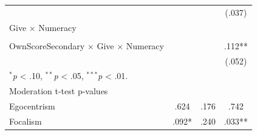 \begin{tabular*}{.84\linewidth}{@{\extracolsep{\fill}}lccc}
    &  &  & \mbox{(.037)\hphantom{88}}\\
   Give $\times$ Numeracy &  &  & \\
    &  &  & \\
   OwnScoreSecondary $\times$ Give $\times$ Numeracy &  &  & \mbox{\hphantom{8}.112**\hphantom{8}}\\
    &  &  & \mbox{(.052)\hphantom{88}}\\
   \multicolumn{4}{l}{\scriptsize $^{*}$\textit{p} < .10, $^{**}$\textit{p} < .05, $^{***}$\textit{p} < .01.}\\
   \midrule
   Moderation t-test p-values &  &  & \\
   \hspace{1em}Egocentrism & \mbox{\hphantom{8}.624\hphantom{888}} & \mbox{\hphantom{8}.176\hphantom{888}} & \mbox{\hphantom{8}.742\hphantom{888}}\\
   \hspace{1em}Focalism & \mbox{\hphantom{8}.092*\hphantom{88}} & \mbox{\hphantom{8}.240\hphantom{888}} & \mbox{\hphantom{8}.033**\hphantom{8}}\\
   \bottomrule
\end{tabular*}
\par\endgroup
